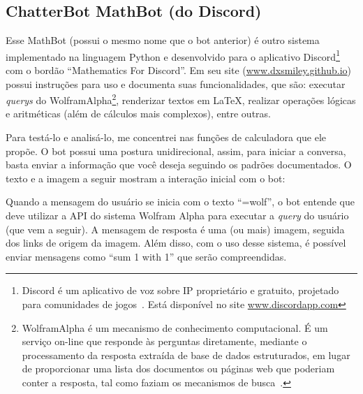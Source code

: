 \subsection{ChatterBot MathBot (do Discord)}\label{subsec:bot3} 

Esse MathBot (possui o mesmo nome que o bot anterior) é outro sistema implementado na linguagem Python e desenvolvido para o aplicativo Discord\footnote{Discord é um aplicativo de voz sobre IP proprietário e gratuito, projetado para comunidades de jogos~\cite{wiki_discord}. Está disponível no site \url{www.discordapp.com}} com o bordão ``Mathematics For Discord''.
Em seu site (\url{www.dxsmiley.github.io}) possui instruções para uso e documenta suas funcionalidades, que são:
executar \emph{querys} do Wolfram\textbar Alpha\footnote{Wolfram\textbar Alpha é um mecanismo de conhecimento computacional. É um serviço on-line que responde às perguntas diretamente, mediante o processamento da resposta extraída de base de dados estruturados, em lugar de proporcionar uma lista dos documentos ou páginas web que poderiam conter a resposta, tal como faziam os mecanismos de busca~\cite{wiki_wolfram}.},
renderizar textos em \LaTeX{}, realizar operações lógicas e aritméticas (além de cálculos mais complexos), entre outras.

Para testá-lo e analisá-lo, me concentrei nas funções de calculadora que ele propõe. 
O bot possui uma postura unidirecional, assim, para iniciar a conversa, basta enviar a informação que você deseja seguindo os padrões documentados.
O texto e a imagem a seguir mostram a interação inicial com o bot:



Quando a mensagem do usuário se inicia com o texto ``=wolf'', o bot entende que deve utilizar a API do sistema Wolfram Alpha para executar a \emph{query} do usuário (que vem a seguir). A mensagem de resposta é uma (ou mais) imagem, seguida dos links de origem da imagem. Além disso, com o uso desse sistema, é possível enviar mensagens como ``sum 1 with 1'' que serão compreendidas.